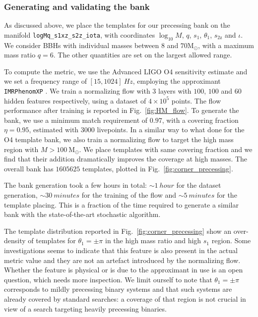 \documentclass[twocolumn,showpacs,preprintnumbers,nofootinbib,prd,
superscriptaddress,10pt]{revtex4-2}
\begin{document}
\subsubsection{Generating and validating the bank}

As discussed above, we place the templates for our precessing bank on the manifold \texttt{logMq\_s1xz\_s2z\_iota}, with coordinates $\log_{10}M$, $q$, $s_\text{1}$, $\theta_\text{1}$, $s_\text{2z}$ and $\iota$.
We consider BBHs with individual masses between  $8$ and $70 \mathrm{M_\odot}$, with a maximum mass ratio $q = 6$.
The other quantities are set on the largest allowed range.

To compute the metric, we use the Advanced LIGO O4 sensitivity estimate \cite{O4_PSDs} and we set a frequency range of $[15, 1024] \SI{}{Hz}$, employing the approximant \texttt{IMRPhenomXP} \cite{Pratten:2020ceb}.
We train a normalizing flow with $3$ layers with $100$, $100$ and $60$ hidden features respectively, using a dataset of $4\times 10^5$ points.
The flow performance after training is reported in Fig.~\ref{fig:HM_flow}.
To generate the bank, we use a minimum match requirement of $0.97$, with a covering fraction $\eta = 0.95$, estimated with $3000$ livepoints.
In a similar way to what done for the O4 template bank, we also train a normalizing flow to target the high mass region with $M>\SI{100}{\mathrm{M_\odot}}$. We place templates with same covering fraction and we find that their addition dramatically improves the coverage at high masses.
The overall bank has $1605625$ templates, plotted in Fig.~\ref{fig:corner_precessing}.

The bank generation took a few hours in total: ${\sim \SI{1}{hour}}$ for the dataset generation, ${\sim \SI{30}{minutes}}$ for the training of the flow and ${\sim \SI{5}{minutes}}$ for the template placing. This is a fraction of the time required to generate a similar bank with the state-of-the-art stochastic algorithm.

The template distribution reported in Fig.~\ref{fig:corner_precessing} show an over-density of templates for $\theta_1 = \pm\pi$ in the high mass ratio and high $s_1$ region. Some investigations seems to indicate that this feature is also present in the actual metric value and they are not an artefact introduced by the normalizing flow. Whether the feature is physical or is due to the approximant in use is an open question, which needs more inspection.
We limit ourself to note that $\theta_1 = \pm\pi$ corresponds to mildly precessing binary systems and that such systems are already covered by standard searches: a coverage of that region is not crucial in view of a search targeting heavily precessing binaries.
\end{document}
